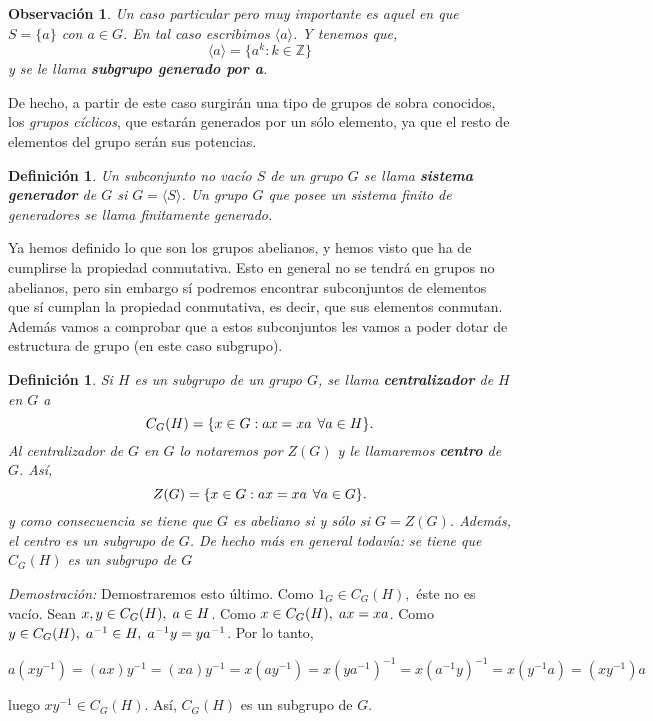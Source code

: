 \documentclass[12pt]{article}
\newtheorem{definition}[theorem]{Definición}
\newtheorem{observation}{Observación}[theorem]
\begin{document}
\begin{observation} Un caso particular pero muy importante es aquel en que $S = \lbrace a \rbrace$ con $a \in G$. En tal caso escribimos $\langle a \rangle$. Y tenemos que, $$\langle a \rangle = \lbrace a^{k} : k \in \mathbb{Z}\rbrace$$ y se le llama \textbf{subgrupo generado por a}.\end{observation}

De hecho, a partir de este caso surgirán una tipo de grupos de sobra conocidos, los \textit{grupos cíclicos}, que estarán generados por un sólo elemento, ya que el resto de elementos del grupo serán sus potencias. 

\begin{definition}Un subconjunto no vacío $S$ de un grupo $G$ se llama \textbf{sistema generador} de $G$ si $G = \langle S \rangle$. Un grupo $G$ que posee un sistema finito de generadores se llama \textit{finitamente generado}. 
\end{definition} 

Ya hemos definido lo que son los grupos abelianos, y hemos visto que ha de cumplirse la propiedad conmutativa. Esto en general no se tendrá en grupos no abelianos, pero sin embargo sí podremos encontrar subconjuntos de elementos que sí cumplan la propiedad conmutativa, es decir, que sus elementos conmutan. Además vamos a comprobar que a estos subconjuntos les vamos a poder dotar de estructura de grupo (en este caso subgrupo).

\begin{definition}\label{eq:centro} Si $H$ es un subgrupo de un grupo $G$, se llama \textbf{centralizador} de $H$ en $G$ a $$C_{G}(H) = \lbrace x \in G : ax = xa \hspace{0.15cm} \forall a \in H\rbrace.$$
Al centralizador de $G$ en $G$ lo notaremos por $Z(G)$ y le llamaremos \textbf{centro} de $G$. Así, $$Z(G) = \lbrace x \in G : ax = xa \hspace{0.15cm} \forall a \in G\rbrace.$$
y como consecuencia se tiene que $G$ es abeliano si y sólo si $G = Z(G)$. Además, el centro es un subgrupo de $G$. De hecho más en general todavía: se tiene que $C_{G}(H)$ es un subgrupo de $G$
\end{definition}
\emph{Demostración: } Demostraremos esto último. Como $1_{G} \in C_{G}(H),$ éste no es vacío. Sean $x,y \in C_{G}(H),\hspace{0.1cm} a \in H$. Como $x\in C_{G}(H),\hspace{0.1cm} ax = xa$. Como $y \in C_{G}(H), \hspace{0.1cm} a^{-1} \in H,\hspace{0.1cm} a^{-1}y = ya^{-1}$. Por lo tanto, \begin{center}$a(xy^{-1}) = (ax)y^{-1} = (xa)y^{-1} = x(ay^{-1}) = x(ya^{-1})^{-1} = x(a^{-1}y)^{-1} = x(y^{-1}a) = (xy^{-1})a$\end{center} luego $xy^{-1} \in C_{G}(H)$. Así, $C_{G}(H)$ es un subgrupo de $G$.
\end{document}
